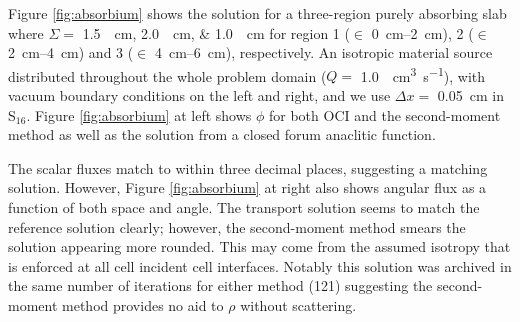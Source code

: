 Figure \ref{fig:absorbium} shows the solution for a three-region purely absorbing slab where $\Sigma = $ \qtylist{1.5; 2.0; 1.0}{\per\centi\meter} for region 1 ($\in$ \SI{0}{\centi\meter}--\SI{2}{\centi\meter}), 2 ($\in$ \SI{2}{\centi\meter}--\SI{4}{\centi\meter}) and 3 ($\in$ \SI{4}{\centi\meter}--\SI{6}{\centi\meter}), respectively.
An isotropic material source distributed throughout the whole problem domain ($Q=$ \SI{1.0}{\per\centi\meter\cubed\per\s}), with vacuum boundary conditions on the left and right, and we use $\Delta x =$ \SI{0.05}{\centi\meter} in S$_{16}$.
Figure \ref{fig:absorbium} at left shows $\phi$ for both OCI and the second-moment method as well as the solution from a closed forum anaclitic function.

The scalar fluxes match to within three decimal places, suggesting a matching solution.
However, Figure \ref{fig:absorbium} at right also shows angular flux as a function of both space and angle.
The transport solution seems to match the reference solution clearly; however, the second-moment method smears the solution appearing more rounded.
This may come from the assumed isotropy that is enforced at all cell incident cell interfaces. 
Notably this solution was archived in the same number of iterations for either method (\num{121}) suggesting the second-moment method provides no aid to $\rho$ without scattering.

